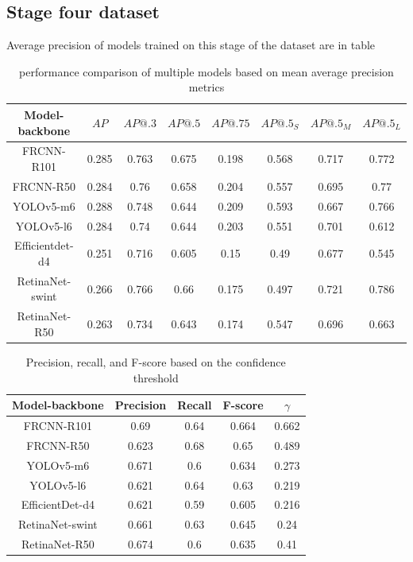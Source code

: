 \subsection{Stage four dataset}
Average precision of models trained on this stage of the dataset are in table

\begin{table}[H]
    \begin{tabular}{|c|c|c|c|c|c|c|c|}
        \hline
        Model-backbone  & $AP$  & $AP@.3$ & $AP@.5$ & $AP@.75$ & $AP@.5_S$ & $AP@.5_M$ & $AP@.5_L$ \\ \hline
        FRCNN-R101      & 0.285 & 0.763   & 0.675   & 0.198    & 0.568     & 0.717     & 0.772     \\ \hline
        FRCNN-R50       & 0.284 & 0.76    & 0.658   & 0.204    & 0.557     & 0.695     & 0.77      \\ \hline
        YOLOv5-m6       & 0.288 & 0.748   & 0.644   & 0.209    & 0.593     & 0.667     & 0.766     \\ \hline
        YOLOv5-l6       & 0.284 & 0.74    & 0.644   & 0.203    & 0.551     & 0.701     & 0.612     \\ \hline
        Efficientdet-d4 & 0.251 & 0.716   & 0.605   & 0.15     & 0.49      & 0.677     & 0.545     \\ \hline
        RetinaNet-swint & 0.266 & 0.766   & 0.66    & 0.175    & 0.497     & 0.721     & 0.786     \\ \hline
        RetinaNet-R50   & 0.263 & 0.734   & 0.643   & 0.174    & 0.547     & 0.696     & 0.663     \\ \hline
    \end{tabular}
    \caption{performance comparison of multiple models based on mean average precision metrics}
    \label{tab:model_results:stage_four}
\end{table}

\begin{table}[H]
    \begin{tabular}{|c||c|c|c|c|}
        \hline
        Model-backbone  & Precision & Recall & F-score & $\gamma$ \\ \hline
        FRCNN-R101      & 0.69      & 0.64   & 0.664   & 0.662    \\ \hline
        FRCNN-R50       & 0.623     & 0.68   & 0.65    & 0.489    \\ \hline
        YOLOv5-m6       & 0.671     & 0.6    & 0.634   & 0.273    \\ \hline
        YOLOv5-l6       & 0.621     & 0.64   & 0.63    & 0.219    \\ \hline
        EfficientDet-d4 & 0.621     & 0.59   & 0.605   & 0.216    \\ \hline
        RetinaNet-swint & 0.661     & 0.63   & 0.645   & 0.24     \\ \hline
        RetinaNet-R50   & 0.674     & 0.6    & 0.635   & 0.41     \\ \hline
    \end{tabular}
    \caption{Precision, recall, and F-score based on the confidence threshold}
    \label{tab:model_prf:stage_four}
\end{table}

